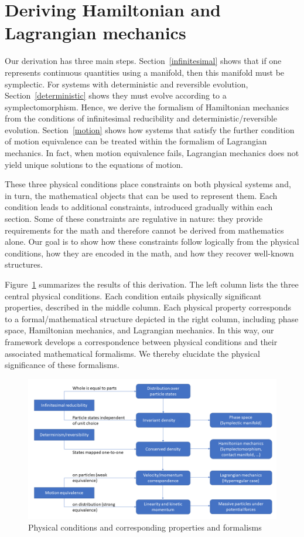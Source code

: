 \documentclass[12pt, twoside]{article}
\begin{document}
\section{Deriving Hamiltonian and Lagrangian mechanics}
\label{derivation}

Our derivation has three main steps. Section~\ref{infinitesimal} shows that {\color{green} if one represents continuous quantities using a manifold, then this manifold must be symplectic.} For systems with deterministic and reversible evolution, Section~\ref{deterministic} shows they must evolve according to a symplectomorphism. Hence, we derive the formalism of Hamiltonian mechanics from the conditions of infinitesimal reducibility and deterministic/reversible evolution. Section~\ref{motion} shows how systems that satisfy the further condition of motion equivalence can be treated within the formalism of Lagrangian mechanics. {\color{green}In fact, when motion equivalence fails, Lagrangian mechanics does not yield unique solutions to the equations of motion.}

These three physical conditions place constraints on both physical systems and, in turn, the mathematical objects that can be used to represent them. Each condition leads to additional constraints, introduced gradually within each section.  Some of these constraints are regulative in nature: they provide requirements for the math and therefore cannot be derived from mathematics alone. Our goal is to show how these constraints follow logically from the physical conditions, how they are encoded in the math, and how they recover well-known structures.

Figure~\ref{diagram} summarizes the results of this derivation. The left column lists the three central physical conditions. Each condition entails physically significant properties, described in the middle column. Each physical property corresponds to a formal/mathematical structure depicted in the right column, including phase space, Hamiltonian mechanics, and Lagrangian mechanics. In this way, our framework develops a correspondence between physical conditions and their associated mathematical formalisms. We thereby elucidate the physical significance of these formalisms.

\begin{figure}[h]
	\centering
	\includegraphics[width=\textwidth]{Diagram.png}
\caption{Physical conditions and corresponding properties and formalisms}
\label{diagram}
\end{figure}
\end{document}
